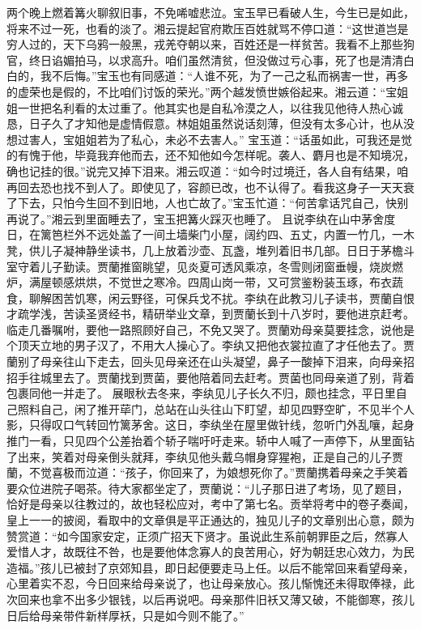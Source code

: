 \documentclass[12pt,oneside]{book}
\begin{document}
两个晚上燃着篝火聊叙旧事，不免唏嘘悲泣。宝玉早已看破人生，今生已是如此，将来不过一死，也看的淡了。湘云提起官府欺压百姓就骂不停口道：“这世道岂是穷人过的，天下乌鸦一般黑，戎羌夺朝以来，百姓还是一样贫苦。我看不上那些狗官，终日谄媚拍马，以求高升。咱们虽然清贫，但没做过亏心事，死了也是清清白白的，我不后悔。”宝玉也有同感道：“人谁不死，为了一己之私而祸害一世，再多的虚荣也是假的，不比咱们讨饭的荣光。”两个越发愤世嫉俗起来。湘云道：“宝姐姐一世把名利看的太过重了。他其实也是自私冷漠之人，以往我见他待人热心诚恳，日子久了才知他是虚情假意。林姐姐虽然说话刻薄，但没有太多心计，也从没想过害人，宝姐姐若为了私心，未必不去害人。”
宝玉道：“话虽如此，可我还是觉的有愧于他，毕竟我弃他而去，还不知他如今怎样呢。袭人、麝月也是不知境况，确也记挂的很。”说完又掉下泪来。湘云叹道：“如今时过境迁，各人自有结果，咱再回去恐也找不到人了。即使见了，容颜已改，也不认得了。看我这身子一天天衰了下去，只怕今生回不到旧地，人也亡故了。”宝玉忙道：“何苦拿话咒自己，快别再说了。”湘云到里面睡去了，宝玉把篝火踩灭也睡了。
且说李纨在山中茅舍度日，在篱笆栏外不远处盖了一间土墙柴门小屋，阔约四、五丈，内置一竹几，一木凳，供儿子凝神静坐读书，几上放着沙壶、瓦盏，堆列着旧书几部。日日于茅檐斗室守着儿子勤读。贾蘭推窗眺望，见炎夏可透风乘凉，冬雪则闭窗垂幔，烧炭燃炉，满屋顿感烘烘，不觉世之寒冷。四周山岗一带，又可赏鉴粉装玉琢，布衣蔬食，聊解困苦饥寒，闲云野径，可保兵戈不扰。李纨在此教习儿子读书，贾蘭自恨才疏学浅，苦读圣贤经书，精研举业文章，到贾蘭长到十八岁时，要他进京赶考。临走几番嘱咐，要他一路照顾好自己，不免又哭了。贾蘭劝母亲莫要挂念，说他是个顶天立地的男子汉了，不用大人操心了。李纨又把他衣裳拉直了才任他去了。贾蘭别了母亲往山下走去，回头见母亲还在山头凝望，鼻子一酸掉下泪来，向母亲招招手往城里去了。贾蘭找到贾菌，要他陪着同去赶考。贾菌也同母亲道了别，背着包裹同他一并走了。
展眼秋去冬来，李纨见儿子长久不归，颇也挂念，平日里自己照料自己，闲了推开荜门，总站在山头往山下盯望，却见四野空旷，不见半个人影，只得叹口气转回竹篱茅舍。这日，李纨坐在屋里做针线，忽听门外乱嚷，起身推门一看，只见四个公差抬着个轿子喘吁吁走来。轿中人喊了一声停下，从里面钻了出来，笑着对母亲倒头就拜，李纨见他头戴乌帽身穿猩袍，正是自己的儿子贾蘭，不觉喜极而泣道：“孩子，你回来了，为娘想死你了。”贾蘭携着母亲之手笑着要众位进院子喝茶。待大家都坐定了，贾蘭说：“儿子那日进了考场，见了题目，恰好是母亲以往教过的，故也轻松应对，考中了第七名。贡举将考中的卷子奏闻，皇上一一的披阅，看取中的文章俱是平正通达的，独见儿子的文章别出心意，颇为赞赏道：“如今国家安定，正须广招天下贤才。虽说此生系前朝罪臣之后，然寡人爱惜人才，故既往不咎，也是要他体念寡人的良苦用心，好为朝廷忠心效力，为民造福。”孩儿已被封了京郊知县，即日起便要走马上任。以后不能常回来看望母亲，心里着实不忍，今日回来给母亲说了，也让母亲放心。孩儿惭愧还未得取俸禄，此次回来也拿不出多少银钱，以后再说吧。母亲那件旧袄又薄又破，不能御寒，孩儿日后给母亲带件新样厚袄，只是如今则不能了。”
\end{document}
